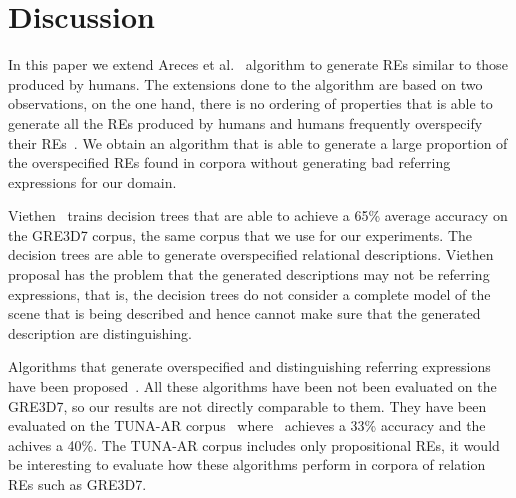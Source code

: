 \section{Discussion}
\label{sec:discussion}

In this paper we extend Areces et al.~ algorithm to generate REs similar to those produced by humans. The extensions done to the algorithm are based on two observations, on the one hand, there is no ordering of properties that is able to generate all the REs produced by humans and humans frequently overspecify their REs~\cite{Engelhardt_Bailey_Ferreira_2006,Arts_Maes_Noordman_Jansen_2011}. We obtain an algorithm that is able to generate a large proportion of the overspecified REs found in corpora without generating bad referring expressions for our domain.

Viethen~ trains decision trees that are able to achieve a 65\% average accuracy on the GRE3D7 corpus, the same corpus that we use for our experiments. The decision trees are able to generate overspecified relational descriptions. Viethen proposal has the problem that the generated descriptions may not be referring expressions, that is, the decision trees do not consider a complete model of the scene that is being described and hence cannot make sure that the generated description are distinguishing.

Algorithms that generate overspecified and distinguishing referring expressions have been proposed~\cite{delucena-paraboni:2008:ENLG,ruud-emiel-mariet:2012:INLG2012}. All these algorithms have been not been evaluated on the GRE3D7, so our results are not directly comparable to them. They have been evaluated on the TUNA-AR corpus~\cite{gatt-balz-kow:2008:ENLG} where~\cite{delucena-paraboni:2008:ENLG} achieves a 33\% accuracy and the~\cite{ruud-emiel-mariet:2012:INLG2012} achives a 40\%. The TUNA-AR corpus includes only propositional REs, it would be interesting to evaluate how these algorithms perform in corpora of relation REs such as GRE3D7. 

